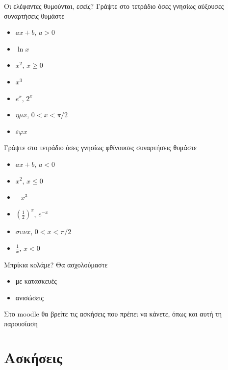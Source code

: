 \documentclass{presentation}
\begin{document}
\begin{frame}{Οι ελέφαντες θυμούνται, εσείς?}
  Γράψτε στο τετράδιο όσες γνησίως αύξουσες συναρτήσεις θυμάστε \pause
  \begin{multicols}{2}
    \begin{itemize}
      \item $ax+b$, $a>0$
      \item $\ln x$
      \item $x^2$, $x\ge 0$
      \item $x^3$
      \item $e^x$, $2^x$
      \item $ημ x$, $0< x< \pi/2$
      \item $εφ x$
    \end{itemize} \pause
  \end{multicols}

  Γράψτε στο τετράδιο όσες γνησίως φθίνουσες συναρτήσεις θυμάστε \pause
  \begin{multicols}{2}
    \begin{itemize}
      \item $ax+b$, $a<0$
      \item $x^2$, $x\le 0$
      \item $-x^3$
      \item $\left(\frac{1}{2}\right)^x$, $e^{-x}$
      \item $συν x$, $0< x< \pi/2$
      \item $\frac{1}{x}$, $x<0$
    \end{itemize}
  \end{multicols}
\end{frame}

\begin{frame}{Μπρίκια κολάμε?}
  Θα ασχολούμαστε
  \begin{itemize}
    \item με κατασκευές
    \item ανισώσεις
  \end{itemize}
\end{frame}

\begin{frame}[noframenumbering]
  Στο moodle θα βρείτε τις ασκήσεις που πρέπει να κάνετε, όπως και αυτή τη παρουσίαση
\end{frame}

\section{Ασκήσεις}
\end{document}
